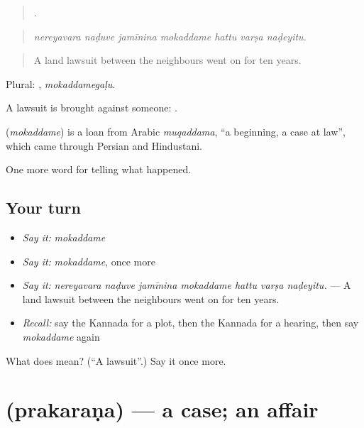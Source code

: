 \begin{quote}
      .
\end{quote}

\begin{quote}
\emph{nereyavara naḍuve jamīnina mokaddame hattu varṣa naḍeyitu.}
\end{quote}

\begin{quote}
A land lawsuit between the neighbours went on for ten years.
\end{quote}

Plural: , \emph{mokaddamegaḷu}.

A lawsuit is brought against someone:   .

\begin{cousinweb}
\textbf{} (\emph{mokaddame}) is a loan from Arabic \emph{muqaddama}, \textquotedblleft{}a beginning, a case at law\textquotedblright{}, which came through Persian and Hindustani.
\end{cousinweb}

\begin{grammarlens}[title={What you've built}]
One more word for telling what happened.
\end{grammarlens}

\subsection*{Your turn}
\begin{itemize}
\raggedright
  \item \emph{Say it:} \emph{mokaddame}
  \item \emph{Say it:} \emph{mokaddame}, once more
  \item \emph{Say it:} \emph{nereyavara naḍuve jamīnina mokaddame hattu varṣa naḍeyitu.} — A land lawsuit between the neighbours went on for ten years.
  \item \emph{Recall:} say the Kannada for a plot, then the Kannada for a hearing, then say \emph{mokaddame} again
\end{itemize}

\begin{tcolorbox}[breakable,colback=teal!4,colframe=teal!35!black,title={Before you move on}]
What does  mean? (\textquotedblleft{}A lawsuit\textquotedblright{}.) Say it once more.
\end{tcolorbox}
\section[\texorpdfstring{\kn{ಪ್ರಕರಣ} (prakaraṇa)}{ಪ್ರಕರಣ (prakaraṇa)}]{ (prakaraṇa) — a case; an affair}

